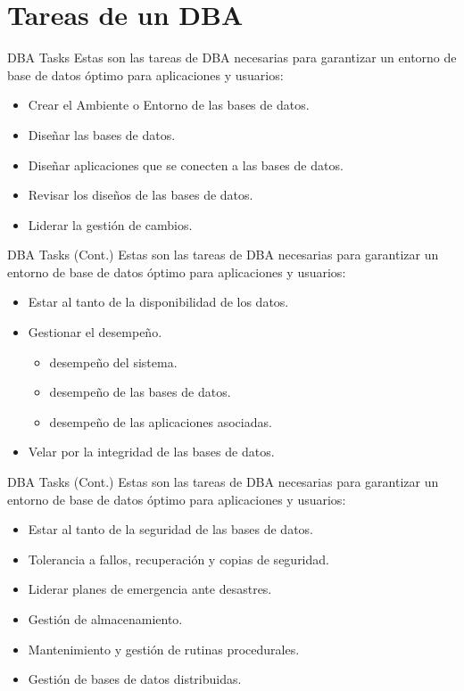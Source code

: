 \documentclass{beamer}
\begin{document}
\section{Tareas de un DBA}

\begin{frame}{DBA Tasks}
    \centering
    Estas son las tareas de DBA necesarias para garantizar un entorno de base de datos óptimo para aplicaciones y usuarios:
    \begin{itemize}
        \item Crear el Ambiente o Entorno de las bases de datos.
        \item Diseñar las bases de datos.
        \item Diseñar aplicaciones que se conecten a las bases de datos.
        \item Revisar los diseños de las bases de datos.
        \item Liderar la gestión de cambios.
    \end{itemize}
\end{frame}

\begin{frame}{DBA Tasks (Cont.)}
    \centering
    Estas son las tareas de DBA necesarias para garantizar un entorno de base de datos óptimo para aplicaciones y usuarios:
    \begin{itemize}
        \item Estar al tanto de la disponibilidad de los datos.
        \item Gestionar el desempeño.
        \begin{itemize}
            \item desempeño del sistema.
            \item desempeño de las bases de datos.
            \item desempeño de las aplicaciones asociadas.
        \end{itemize}
        \item Velar por la integridad de las bases de datos.
    \end{itemize}
\end{frame}

\begin{frame}{DBA Tasks (Cont.)}
    \centering
    Estas son las tareas de DBA necesarias para garantizar un entorno de base de datos óptimo para aplicaciones y usuarios:
    \begin{itemize}
        \item Estar al tanto de la seguridad de las bases de datos.
        \item Tolerancia a fallos, recuperación y copias de seguridad.
        \item Liderar planes de emergencia ante desastres.
        \item Gestión de almacenamiento.
        \item Mantenimiento y gestión de rutinas procedurales.
        \item Gestión de bases de datos distribuidas.
    \end{itemize}
\end{frame}
\end{document}
